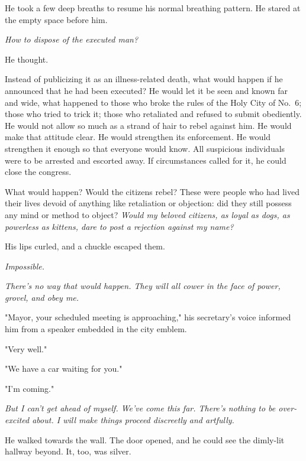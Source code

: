 He took a few deep breaths to resume his normal breathing pattern. He
stared at the empty space before him.

\emph{How to dispose of the executed man?}

He thought.

Instead of publicizing it as an illness-related death, what would happen
if he announced that he had been executed? He would let it be seen and
known far and wide, what happened to those who broke the rules of the
Holy City of No.~6; those who tried to trick it; those who retaliated
and refused to submit obediently. He would not allow so much as a strand
of hair to rebel against him. He would make that attitude clear. He
would strengthen its enforcement. He would strengthen it enough so that
everyone would know. All suspicious individuals were to be arrested and
escorted away. If circumstances called for it, he could close the
congress.

What would happen? Would the citizens rebel? These were people who had
lived their lives devoid of anything like retaliation or objection: did
they still possess any mind or method to object? \emph{Would my beloved
citizens, as loyal as dogs, as powerless as kittens, dare to post a
rejection against my name?}

His lips curled, and a chuckle escaped them.

\emph{Impossible.}

\emph{There's no way that would happen. They will all cower in the face of
power, grovel, and obey me.}

"Mayor, your scheduled meeting is approaching," his secretary's voice
informed him from a speaker embedded in the city emblem.

"Very well."

"We have a car waiting for you."

"I'm coming."

\emph{But I can't get ahead of myself. We've come this far. There's nothing to
be over-excited about. I will make things proceed discreetly and
artfully.}

He walked towards the wall. The door opened, and he could see the
dimly-lit hallway beyond. It, too, was silver.